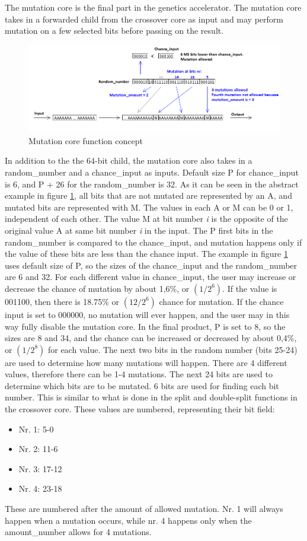 The mutation core is the final part in the genetics accelerator. 
The mutation core takes in a forwarded child from the crossover core as input and may perform mutation on a few selected bits before passing on the result. 

\begin{figure}[H]
\includegraphics[width=\textwidth]{fpga/fig/mutation.png}
\caption{Mutation core function concept}
\label{Fig_Mutation}
\end{figure}

In addition to the the 64-bit child, the mutation core also takes in a random\_number and a chance\_input as inputs. 
Default size P for chance\_input is 6, and P + 26 for the random\_number is 32. 
As it can be seen in the abstract example in figure \ref{Fig_Mutation}, all bits that are not mutated are represented by an A, and mutated bits are represented with M. 
The values in each A or M can be 0 or 1, independent of each other. 
The value M at bit number \emph{i} is the opposite of the original value A at same bit number \emph{i} in the input.
The P first bits in the random\_number is compared to the chance\_input, and mutation happens only if the value of these bits are less than the chance input. 
The example in figure \ref{Fig_Mutation} uses default size of P, so the sizes of the chance\_input and the random\_number are 6 and 32.
For each different value in chance\_input, the user may increase or decrease the chance of mutation by about 1,6\%, or $(1 / 2^6)$.
If the value is 001100, then there is 18.75\% or $(12 / 2^6)$ chance for mutation.
If the chance input is set to 000000, no mutation will ever happen, and the user may in this way fully disable the mutation core.
In the final product, P is set to 8, so the sizes are 8 and 34, and the chance can be increased or decreased by about 0,4\%, or $(1 / 2^8)$ for each value. 
The next two bits in the random number (bits 25-24) are used to determine how many mutations will happen. 
There are 4 different values, therefore there can be 1-4 mutations.
The next 24 bits are used to determine which bits are to be mutated. 
6 bits are used for finding each bit number. 
This is similar to what is done in the split and double-split functions in the crossover core. 
These values are numbered, representing their bit field:
\begin{itemize}
\item Nr. 1: 5-0
\item Nr. 2: 11-6
\item Nr. 3: 17-12
\item Nr. 4: 23-18
\end{itemize}
These are numbered after the amount of allowed mutation. 
Nr. 1 will always happen when a mutation occurs, while nr. 4 happens only when the amount\_number allows for 4 mutations.

